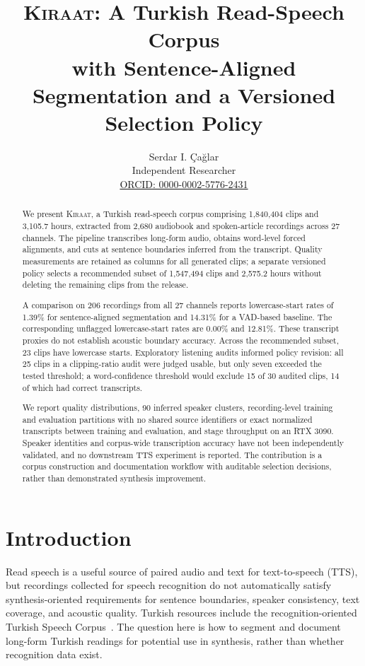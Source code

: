\documentclass[11pt,a4paper]{article}
\title{\textsc{Kiraat}: A Turkish Read-Speech Corpus\\
with Sentence-Aligned Segmentation and a Versioned Selection Policy}
\author{Serdar I. Ça\u{g}lar\\
\small Independent Researcher\\
\small \href{https://orcid.org/0000-0002-5776-2431}{ORCID: 0000-0002-5776-2431}}
\date{}
\begin{document}
\maketitle


\begin{abstract}
\noindent
We present \textsc{Kiraat}, a Turkish read-speech corpus comprising
1,840,404 clips and 3,105.7 hours, extracted from 2,680 audiobook and
spoken-article recordings across 27 channels. The pipeline transcribes
long-form audio, obtains word-level forced alignments, and cuts at sentence
boundaries inferred from the transcript. Quality measurements are retained
as columns for all generated clips; a separate versioned policy selects a
recommended subset of 1,547,494 clips and 2,575.2 hours without deleting
the remaining clips from the release.

A comparison on 206 recordings from all 27 channels reports lowercase-start
rates of 1.39\% for sentence-aligned segmentation and 14.31\% for a VAD-based
baseline. The corresponding unflagged lowercase-start rates are 0.00\% and
12.81\%. These transcript proxies do not establish acoustic boundary
accuracy. Across the recommended subset, 23 clips have lowercase starts.
Exploratory listening audits informed policy revision: all 25 clips in a
clipping-ratio audit were judged usable, but only seven exceeded the tested
threshold; a word-confidence threshold would exclude 15 of 30 audited clips,
14 of which had correct transcripts.

We report quality distributions, 90 inferred speaker clusters, recording-level
training and evaluation partitions with no shared source identifiers or exact normalized
transcripts between training and evaluation, and stage throughput on an
RTX 3090. Speaker identities and corpus-wide transcription accuracy have not
been independently validated, and no downstream TTS experiment is reported.
The contribution is a corpus construction and documentation workflow with
auditable selection decisions, rather than demonstrated synthesis improvement.
\end{abstract}

\section{Introduction}
Read speech is a useful source of paired audio and text for text-to-speech
(TTS), but recordings collected for speech recognition do not automatically
satisfy synthesis-oriented requirements for sentence boundaries, speaker
consistency, text coverage, and acoustic quality. Turkish resources include
the recognition-oriented Turkish Speech Corpus~\cite{turkicasr}. The question
here is how to segment and document long-form Turkish readings for potential
use in synthesis, rather than whether recognition data exist.
\end{document}

